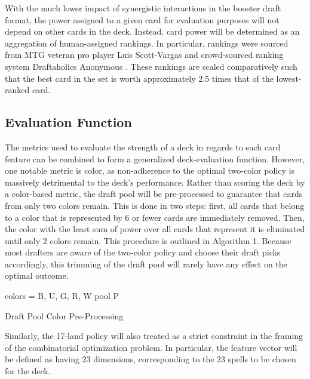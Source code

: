 \documentclass[letterpaper]{article} %
\begin{document}
With the much lower impact of synergistic interactions in the booster draft format, the power assigned to a given card for evaluation purposes will not depend on other cards in the deck. Instead, card power will be determined as an aggregation of human-assigned rankings. In particular, rankings were sourced from MTG veteran pro player Luis Scott-Vargas and crowd-sourced ranking system Draftaholics Anonymous \cite{scott_vargas18} \cite{p1p118}. These rankings are scaled comparatively such that the best card in the set is worth approximately 2.5 times that of the lowest-ranked card.

\subsection{Evaluation Function}

The metrics used to evaluate the strength of a deck in regards to each card feature can be combined to form a generalized deck-evaluation function. However, one notable metric is color, as non-adherence to the optimal two-color policy is massively detrimental to the deck's performance. Rather than scoring the deck by a color-based metric, the draft pool will be pre-processed to guarantee that cards from only two colors remain. This is done in two steps: first, all cards that belong to a color that is represented by 6 or fewer cards are immediately removed. Then, the color with the least sum of power over all cards that represent it is eliminated until only 2 colors remain. This procedure is outlined in Algorithm 1. Because most drafters are aware of the two-color policy and choose their draft picks accordingly, this trimming of the draft pool will rarely have any effect on the optimal outcome.

\begin{algorithm}
\SetAlgoLined
{}
 colors = {B, U, G, R, W}\;
 pool P\;
  {
 }
 \caption{Draft Pool Color Pre-Processing}
\end{algorithm}

Similarly, the 17-land policy will also treated as a strict constraint in the framing of the combinatorial optimization problem. In particular, the feature vector will be defined as having 23 dimensions, corresponding to the 23 spells to be chosen for the deck.
\end{document}
